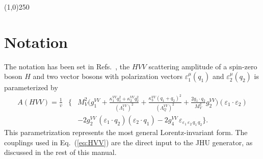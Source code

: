 \documentclass[aps,superscriptaddress,nofootinbib]{revtex4}
\begin{document}
\vspace{0.5cm}
\begin{center}
\line(1,0){250}
\end{center}
\vspace{0.5cm}
\tableofcontents
\begin{center}
\end{center}
\vspace{0.5cm}



\section{Notation}

The notation has been set in Refs.~\cite{Gao:2010qx,Bolognesi:2012,Anderson:2013,Gritsan:2016hjl,Gritsan:2020pib,Davis:2022},
the $HVV$ scattering amplitude of a spin-zero boson $H$ and two vector bosons with polarization vectors 
$\varepsilon_{1}^\mu(q_1)$ and $\varepsilon_{2}^\mu(q_2)$
is parameterized by
\begin{eqnarray}
  A({H V V}) \!=\! \frac{1}{v} &\bigg\{  &
                          M_V^2 \bigg(g_{1}^{VV} 
+ \frac{\kappa_1^{VV}q_{1}^2 + \kappa_2^{VV} q_{2}^{2}}{\left(\Lambda_{1}^{VV} \right)^{2}} + \frac{\kappa_3^{VV} (q_1+q_2)^2}{\left(\Lambda_{Q}^{VV} \right)^{2}} 
+ \frac{2 q_1\cdot q_2}{M_V^2} g_2^{VV}\bigg) (\varepsilon_1 \cdot \varepsilon_2) 
\nonumber \\ &&
                        -2 g_2^{VV} \, {(\varepsilon_1 \cdot q_2)(\varepsilon_2 \cdot q_1)}
                        -2  g_4^{VV} \, {\varepsilon_{\varepsilon_1\,\varepsilon_2\,q_1\,q_2}}
                               \bigg\}.
\label{eq:HVV}
\end{eqnarray}
This parametrization represents the most general Lorentz-invariant form. 
The couplings used in Eq.~(\ref{eq:HVV}) are the direct input to the JHU generator, as discussed
in the rest of this manual. 
\end{document}
